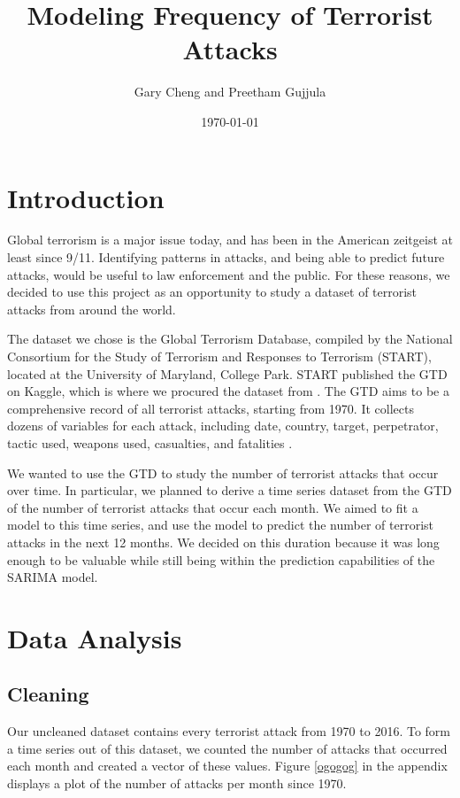 \documentclass[11pt]{paper}
\title{Modeling Frequency of Terrorist Attacks}
\author{Gary Cheng and Preetham Gujjula}
\date{\today}
\begin{document}
\maketitle 

\section{Introduction}
Global terrorism is a major issue today, and has been in the American zeitgeist at least since 9/11. Identifying patterns in attacks, and being able to predict future attacks, would be useful to law enforcement and the public. For these reasons, we decided to use this project as an opportunity to study a dataset of terrorist attacks from around the world.

The dataset we chose is the Global Terrorism Database, compiled by the National Consortium for the Study of Terrorism and Responses to Terrorism (START), located at the University of Maryland, College Park. START published the GTD on Kaggle, which is where we procured the dataset from \cite{kaggle}. The GTD aims to be a comprehensive record of all terrorist attacks, starting from 1970. It collects dozens of variables for each attack, including date, country, target, perpetrator, tactic used, weapons used, casualties, and fatalities \cite{gtdmethodology}.

We wanted to use the GTD to study the number of terrorist attacks that occur over time. In particular, we planned to derive a time series dataset from the GTD of the number of terrorist attacks that occur each month. We aimed to fit a model to this time series, and use the model to predict the number of terrorist attacks in the next 12 months. We decided on this duration because it was long enough to be valuable while still being within the prediction capabilities of the SARIMA model.

\section{Data Analysis}
\subsection{Cleaning}

Our uncleaned dataset contains every terrorist attack from 1970 to 2016. To form a time series out of this dataset, we counted the number of attacks that occurred each month and created a vector of these values. Figure \ref{ogogog} in the appendix displays a plot of the number of attacks per month since 1970.
\end{document}
